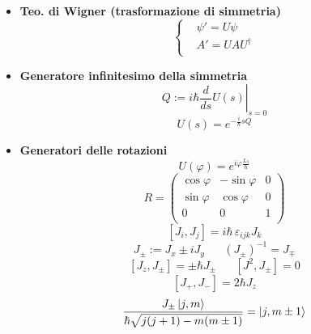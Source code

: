 \documentclass{article}
\DeclarePairedDelimiter\ket{\lvert}{\rangle}
\begin{document}
\begin{footnotesize}
\begin{multicols*}{3}
\begin{itemize}[leftmargin=*]
	\item \textbf{Teo. di Wigner (trasformazione di simmetria)}
		\[
			\left\{\begin{aligned}
				&\psi ' = U\psi \\
				&A' = UAU^\dag \\
			\end{aligned}\right.
		\]
	\item \textbf{Generatore infinitesimo della simmetria}
		\[Q:= \left.i\hbar \frac{d}{ds}U(s)\right|_{s=0}\]
		\[U(s) = e^{-\frac{i}{\hbar }sQ}\]
	\item \textbf{Generatori delle rotazioni}
		\[U(\varphi ) = e^{i\varphi \frac{L_3}{\hbar }}\]
		\[R=\begin{pmatrix}
			\cos\varphi & -\sin\varphi &0\\
			\sin\varphi &\cos\varphi & 0\\
			0&0&1\\
		\end{pmatrix}\]
		\[\left[J_i, J_j\right] = i\hbar\, \varepsilon _{ijk} J_k\]
		\[J_\pm := J_x \pm iJ_y%
		\hspace{20pt} \left(J_\pm\right)^{-1} = J_\mp\]
		\[\left[J_z,J_\pm\right] = \pm\hbar J_\pm \hspace{20pt} \left[J^2,J_\pm\right] = 0\]
		\[\left[J_+, J_-\right] = 2\hbar J_z\]
		\[\frac{J_\pm \, \ket*{j,m}}{\hbar \sqrt{j(j+1) - m(m\pm 1)}} = \ket*{j,m\pm 1}\]


\end{itemize}
\end{multicols*}
\end{footnotesize}
\end{document}
